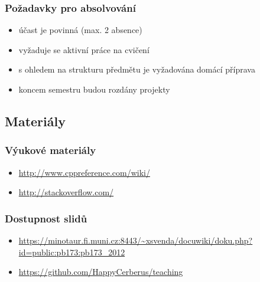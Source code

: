 \begin{frame}
	\frametitle{Požadavky pro absolvování}
	\begin{itemize}
		\item{účast je povinná (max. 2 absence)}
		\item{vyžaduje se aktivní práce na cvičení}
		\item{s ohledem na strukturu předmětu je vyžadována domácí příprava}
		\item{koncem semestru budou rozdány projekty}
	\end{itemize}
\end{frame}

\subsection{Materiály}

\begin{frame}
	\frametitle{Výukové materiály}
	\begin{itemize}
		\item{\url{http://www.cppreference.com/wiki/}}
		\item{\url{http://stackoverflow.com/}}
	\end{itemize}
\end{frame}

\begin{frame}
\frametitle{Dostupnost slidů}
	\begin{itemize}
		\item{\url{https://minotaur.fi.muni.cz:8443/~xsvenda/docuwiki/doku.php?id=public:pb173:pb173\_2012}}
		\item{\url{https://github.com/HappyCerberus/teaching}}
	\end{itemize}
\end{frame}






